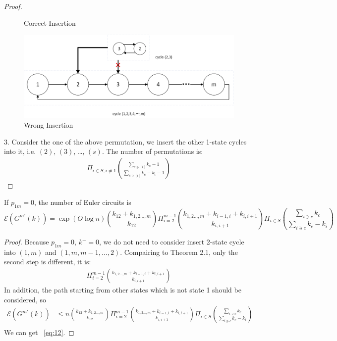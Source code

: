 \documentclass[11pt,en,cite=authoryear]{elegantpaper}
\begin{document}
\begin{proof}
\begin{figure}[h]
        \caption{Correct Insertion}
        \label{fig:insert1}
    \end{figure} 
    \begin{figure}[h] 
        \centering
        \includegraphics[scale=0.5]{insert2.png}
        \caption{Wrong Insertion}
        \label{fig:insert2} 
    \end{figure}

    3. Consider the one of the  above permutation, we insert the other 1-state cycles into it, i.e. $(2)$, $(3)$, \dots, $(s)$.  The number of permutations is:
    \begin{align*}
        \Pi_{i\in S, i\neq 1} \binom{\sum_{c \ni [i]} k_{c} - 1}{\sum_{c \ni [i]} k_{c} - k_{i} - 1}
    \end{align*}
\end{proof}

\begin{corollary}
    If $p_{1m}=0$, the number of Euler circuits is 
    \begin{equation} \label{eq:12}
        \mathcal{E} (G^{m'} (k))
        = \exp(O \log n)  \binom{k_{12}+k_{1,2\dots ,m}}{k_{12}} 
        \Pi_{i=2}^{m-1} \binom{k_{1,2\dots ,m}+ k_{i-1, i}+ k_{i, i+1}}{k_{i, i+1}}
        \Pi_{i \in S} \binom{\sum_{i\ni c} k_{c}}{\sum_{i\ni c} k_{c} - k_{i}}
    \end{equation}
\end{corollary}
\begin{proof}
    Because $p_{1m}=0$, $k^-=0$, we do not need to consider insert 2-state cycle  into $(1,m)$ and $(1, m, m-1, \dots, 2)$. Compairing to Theorem 2.1, only the second step is different, it is:
    \begin{align*}
        \Pi_{i=2}^{m-1} \binom{k_{1,2\dots ,m}+ k_{i-1, i}+ k_{i, i+1}}{k_{i, i+1}}
    \end{align*}
    In addition, the path starting from other states which is not state 1 should be considered, so
    \begin{align*}
        \mathcal{E} (G^{m'} (k))
        &\le  n \binom{k_{12}+k_{1,2\dots ,m}}{k_{12}} 
        \Pi_{i=2}^{m-1} \binom{k_{1,2\dots ,m}+ k_{i-1, i}+ k_{i, i+1}}{k_{i, i+1}}
        \Pi_{i \in S} \binom{\sum_{i\ni c} k_{c}}{\sum_{i\ni c} k_{c} - k_{i}}\\
    \end{align*}
    We can get ~\ref{eq:12}.
\end{proof}
\end{document}

